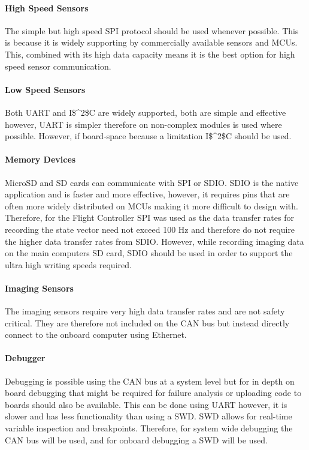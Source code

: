 \paragraph{High Speed Sensors}
The simple but high speed \gls{SPI} protocol should be used whenever possible. This is because it is widely supporting by commercially available sensors and \gls{MCU}s. This, combined with its high data capacity means it is the best option for high speed sensor communication. 
\paragraph{Low Speed Sensors}
Both \gls{UART} and \gls{I$^2$C} are widely supported, both are simple and effective however, \gls{UART} is simpler therefore on non-complex modules is used where possible. However, if board-space because a limitation \gls{I$^2$C} should be used.
\paragraph{Memory Devices}
MicroSD and SD cards can communicate with \gls{SPI} or \gls{SDIO}. \gls{SDIO} is the native application and is faster and more effective, however, it requires pins that are often more widely distributed on \gls{MCU}s making it more difficult to design with. Therefore, for the Flight Controller \gls{SPI} was used as the data transfer rates for recording the state vector need not exceed 100 Hz and therefore do not require the higher data transfer rates from \gls{SDIO}. However, while recording imaging data on the main computers SD card, \gls{SDIO} should be used in order to support the ultra high writing speeds required. 
\paragraph{Imaging Sensors}
The imaging sensors require very high data transfer rates and are not safety critical. They are therefore not included on the \gls{CAN} bus but instead directly connect to the onboard computer using Ethernet. 

\paragraph{Debugger}
Debugging is possible using the \gls{CAN} bus at a system level but for in depth on board debugging that might be required for failure analysis or uploading code to boards should also be available. This can be done using \gls{UART} however, it is slower and has less functionality than using a \gls{SWD}. \gls{SWD} allows for real-time variable inspection and breakpoints. Therefore, for system wide debugging the \gls{CAN} bus will be used, and for onboard debugging a \gls{SWD} will be used.

